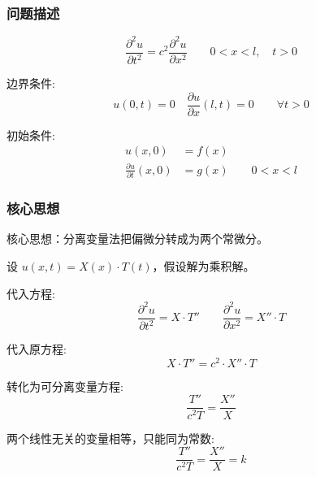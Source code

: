 \documentclass[12pt,a4paper]{article}
\numberwithin{subsection}{section}   %
\numberwithin{subsubsection}{subsection}
\theoremstyle{plain}
\theoremstyle{definition}
\theoremstyle{remark}
\theoremstyle{remark}
\begin{document}
	\subsubsection{问题描述}
	\begin{equation} \label{eq:wave_equation_mixed1}
		\frac{\partial^2 u}{\partial t^2} = c^2 \frac{\partial^2 u}{\partial x^2} \qquad 0 < x < l, \quad t > 0
	\end{equation}
	
	边界条件:
	\begin{equation} \label{eq:boundary_conditions_mixed1}
		u(0, t) = 0 \quad \frac{\partial u}{\partial x}(l, t) = 0 \qquad \forall t > 0
	\end{equation}
	
	初始条件:
	\begin{equation} \label{eq:initial_conditions_mixed1}
		\begin{aligned}
			u(x, 0) &= f(x) \\
			\frac{\partial u}{\partial t}(x, 0) &= g(x) \qquad 0 < x < l
		\end{aligned}
	\end{equation}
	
	\subsubsection{核心思想}
	核心思想：分离变量法把偏微分转成为两个常微分。
	
	设 \(u(x, t) = X(x) \cdot T(t)\)，假设解为乘积解。
	
	代入方程:
	\begin{equation} \label{eq:substitution_mixed1}
		\frac{\partial^2 u}{\partial t^2} = X \cdot T'' \qquad \frac{\partial^2 u}{\partial x^2} = X'' \cdot T
	\end{equation}
	
	代入原方程:
	\begin{equation} \label{eq:original_substitution_mixed1}
		X \cdot T'' = c^2 \cdot X'' \cdot T
	\end{equation}
	
	转化为可分离变量方程:
	\begin{equation} \label{eq:separation_mixed1}
		\frac{T''}{c^2 T} = \frac{X''}{X}
	\end{equation}
	
	两个线性无关的变量相等，只能同为常数:
	\begin{equation} \label{eq:constant_mixed1}
		\frac{T''}{c^2 T} = \frac{X''}{X} = k
	\end{equation}
	
\end{document}
